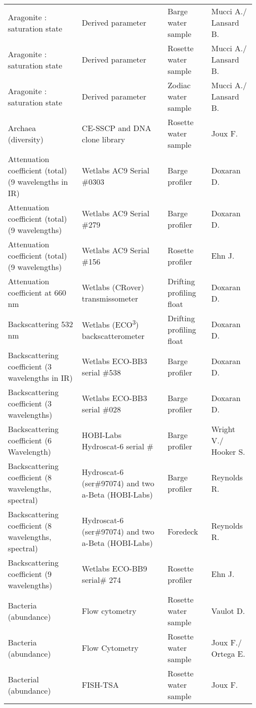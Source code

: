 \begin{longtable}[t]{llll}
Aragonite : saturation state & Derived parameter & Barge water sample & Mucci A./ Lansard B.\\
Aragonite : saturation state & Derived parameter & Rosette water sample & Mucci A./ Lansard B.\\
Aragonite : saturation state & Derived parameter & Zodiac water sample & Mucci A./ Lansard B.\\
\addlinespace
Archaea (diversity) & CE-SSCP and DNA clone library & Rosette water sample & Joux F.\\
Attenuation coefficient (total) (9 wavelengths in IR) & Wetlabs AC9 Serial \#0303 & Barge profiler & Doxaran D.\\
Attenuation coefficient (total) (9 wavelengths) & Wetlabs AC9 Serial \#279 & Barge profiler & Doxaran D.\\
Attenuation coefficient (total) (9 wavelengths) & Wetlabs AC9 Serial \#156 & Rosette profiler & Ehn J.\\
Attenuation coefficient at 660 nm & Wetlabs (CRover) transmissometer & Drifting profiling float & Doxaran D.\\
\addlinespace
Backscattering 532 nm & Wetlabs (ECO\textsuperscript{3}) backscatterometer & Drifting profiling float & Doxaran D.\\
Backscattering coefficient (3 wavelengths in IR) & Wetlabs ECO-BB3 serial \#538 & Barge profiler & Doxaran D.\\
Backscattering coefficient (3 wavelengths) & Wetlabs ECO-BB3 serial \#028 & Barge profiler & Doxaran D.\\
Backscattering coefficient (6 Wavelength) & HOBI-Labs Hydroscat-6 serial \# & Barge profiler & Wright V./ Hooker S.\\
Backscattering coefficient (8 wavelengths, spectral) & Hydroscat-6 (ser\#97074) and two a-Beta (HOBI-Labs) & Barge profiler & Reynolds R.\\
\addlinespace
Backscattering coefficient (8 wavelengths, spectral) & Hydroscat-6 (ser\#97074) and two a-Beta (HOBI-Labs) & Foredeck & Reynolds R.\\
Backscattering coefficient (9 wavelengths) & Wetlabs ECO-BB9 serial\# 274 & Rosette profiler & Ehn J.\\
Bacteria (abundance) & Flow cytometry & Rosette water sample & Vaulot D.\\
Bacteria (abundance) & Flow Cytometry & Rosette water sample & Joux F./ Ortega E.\\
Bacterial (abundance) & FISH-TSA & Rosette water sample & Joux F.\\

\end{longtable}
